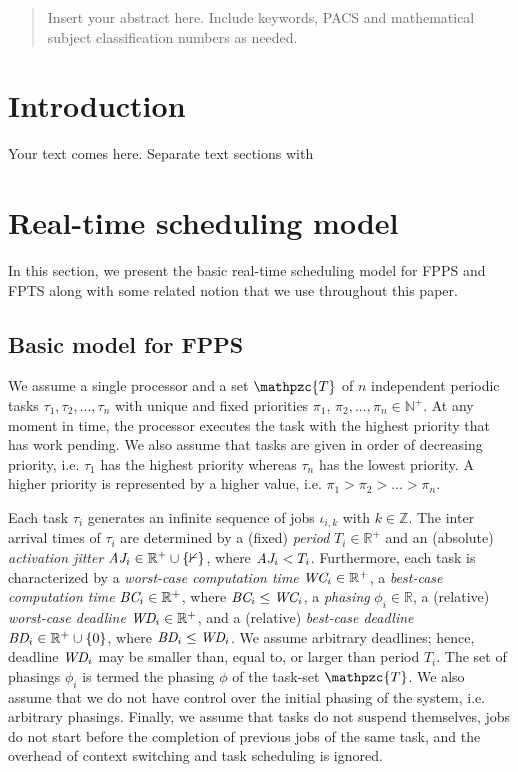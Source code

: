 \begin{abstract}
Insert your abstract here. Include keywords, PACS and mathematical
subject classification numbers as needed.
\end{abstract}

\section{Introduction} \label{intro}
Your text comes here. Separate text sections with

\section{Real-time scheduling model } \label{sec:model}

In this section, we present the basic real-time scheduling model for FPPS and FPTS along with some related notion that we use throughout this paper.

\subsection{Basic model for FPPS}
We assume a single processor and a set $\mathpzc{T}$ of $n$ independent periodic tasks $\tau_1,\tau_2,...,\tau_n$ with unique and fixed priorities $\pi_{1}$, $\pi_{2},...,\pi_{n} \in \mathbb{N^{+}}$. At any moment in time, the processor executes the task with the highest priority that has work pending. We also assume that tasks are given in order of decreasing priority, i.e. $\tau_1$ has the highest priority whereas $\tau_n$ has the lowest priority. A higher priority is represented by a higher value, i.e. $\pi_1 > \pi_2 >...>\pi_n$.

Each task $\tau_i$ generates an infinite sequence of jobs $\iota_{i,k}$ with $k\in \mathbb{Z}$. The inter arrival times of $\tau_i$ are determined by a (fixed) \textit{period} $T_i \in \mathbb{R^{+}}$ and an (absolute) \textit{activation jitter} $\mbox{\it AJ}_i \in \mathbb{R^{+} \cup \{0\} }$, where $\mbox{\it AJ}_i < T_i$. Furthermore, each task is characterized by a \textit{worst-case computation time} $\mbox{\it WC}_i \in \mathbb{R^{+}}$, a \textit{best-case computation time} $\mbox{\it BC}_i \in \mathbb{R^{+}}$, where $\mbox{\it BC}_i \leq \mbox{\it WC}_i$, a \textit{phasing} $\phi_i \in \mathbb{R}$, a (relative) \textit{worst-case deadline} $\mbox{\it WD}_i \in \mathbb{R^{+}}$, and a (relative) \textit{best-case deadline} $\mbox{\it BD}_i \in \mathbb{R^{+}}\cup \{0\}$, where $\mbox{\it BD}_i \leq \mbox{\it WD}_i$. We assume arbitrary deadlines; hence, deadline $\mbox{\it WD}_i$ may be smaller than, equal to, or larger than period $T_i$. The set of phasings $\phi_i$ is termed the phasing $\phi$ of the task-set $\mathpzc{T}$. We also assume that we do not have control over the initial phasing of the system, i.e. arbitrary phasings. Finally, we assume that tasks do not suspend themselves, jobs do not start before the completion of previous jobs of the same task, and the overhead of context switching and task scheduling is ignored.

